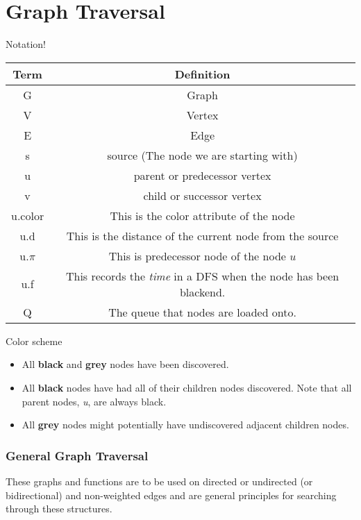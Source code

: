 \part{Graph Traversal}

Notation!

\begin{table}[h!]
\centering
 \begin{tabular}{||c c||} 
 \hline
 Term & Definition \\ [0.5ex] 
 \hline\hline
 G & Graph \\ 
 V & Vertex \\
 E & Edge \\
 s & source (The node we are starting with)\\
 u & parent or predecessor vertex\\
 v & child or successor vertex\\
 u.color & This is the color attribute of the node\\
 u.d & This is the distance of the current node from the source\\
 u.$\pi$ & This is predecessor node of the node $u$ \\
 u.f & This records the \emph{time} in a DFS when the node has been blackend.\\
 Q & The queue that nodes are loaded onto. \\ [1ex] 
 \hline
 \end{tabular}
\end{table}

Color scheme

\begin{itemize}
    \item All \textbf{black} and \textbf{grey} nodes have been discovered.
    \item All \textbf{black} nodes have had all of their children nodes discovered. Note that all parent nodes, \emph{u}, are always black.
    \item All \textbf{grey} nodes might potentially have undiscovered adjacent children nodes.
\end{itemize}

\section{General Graph Traversal}

These graphs and functions are to be used on directed or undirected (or bidirectional) and non-weighted edges and are general principles for searching through these structures.

